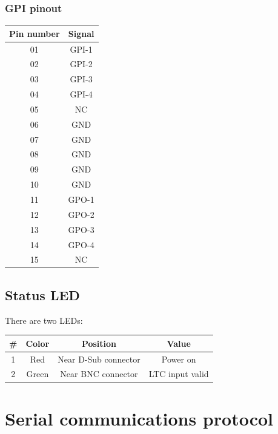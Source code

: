 \documentclass{article}
\begin{document}
		\subsubsection{GPI pinout}\label{gpi-pinout}
			\begin{center}
				\begin{tabular}{|c|c|}
					\hline
					Pin number & Signal \\
					\hline
					01 & GPI-1 \\
					02 & GPI-2 \\
					03 & GPI-3 \\
					04 & GPI-4 \\
					05 & NC \\
					06 & GND \\
					07 & GND \\
					08 & GND \\
					09 & GND \\
					10 & GND \\
					11 & GPO-1 \\
					12 & GPO-2 \\
					13 & GPO-3 \\
					14 & GPO-4 \\
					15 & NC \\
					\hline
				\end{tabular}
			\end{center}
	
		\subsection{Status LED}\label{status-led}
			There are two LEDs:
			\begin{center}
				\begin{tabular}{|c|c|c|c|}
					\hline
					\# & Color & Position & Value \\
					\hline
					1 & Red & Near D-Sub connector & Power on \\
					2 & Green & Near BNC connector & LTC input valid \\
					\hline
				\end{tabular}
			\end{center}
	
	\section{Serial communications protocol}\label{serial-communications-protocol}
\end{document}
